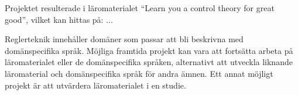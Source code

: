 Projektet resulterade i läromaterialet 
``Learn you a control theory for great good'', vilket kan hittas på:  ... 

Reglerteknik innehåller domäner som passar att bli beskrivna med domänspecifika språk. Möjliga framtida projekt kan vara att fortsätta arbeta på läromaterialet eller de domänspecifika språken, alternativt att utveckla liknande läromaterial och domänspecifika språk för andra ämnen. Ett annat möjligt projekt är att utvärdera läromaterialet i en studie. 